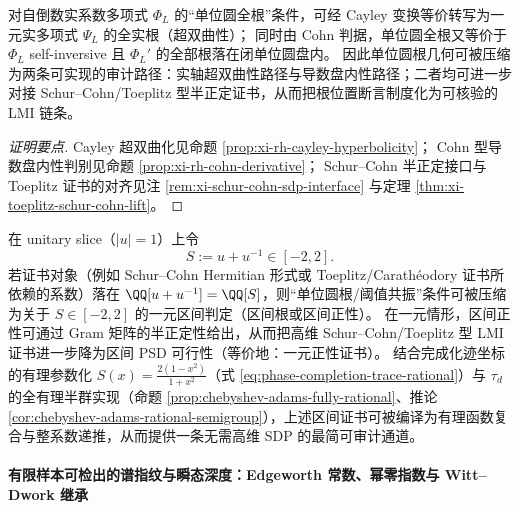 \begin{conclusion}\label{con:xi-cayley-cohn-lmi-certificate-chain}
对自倒数实系数多项式 \(\Phi_L\) 的“单位圆全根”条件，可经 Cayley 变换等价转写为一元实多项式 \(\Psi_L\) 的全实根（超双曲性）；
同时由 Cohn 判据，单位圆全根又等价于 \(\Phi_L\) self-inversive 且 \(\Phi_L'\) 的全部根落在闭单位圆盘内。
因此单位圆根几何可被压缩为两条可实现的审计路径：实轴超双曲性路径与导数盘内性路径；二者均可进一步对接 Schur--Cohn/Toeplitz 型半正定证书，从而把根位置断言制度化为可核验的 LMI 链条。
\end{conclusion}
\begin{proof}[证明要点]
Cayley 超双曲化见命题 \ref{prop:xi-rh-cayley-hyperbolicity}；
Cohn 型导数盘内性判别见命题 \ref{prop:xi-rh-cohn-derivative}；
Schur--Cohn 半正定接口与 Toeplitz 证书的对齐见注 \ref{rem:xi-schur-cohn-sdp-interface} 与定理 \ref{thm:xi-toeplitz-schur-cohn-lift}。
\end{proof}

\begin{conclusion}\label{con:xi-threshold-resonance-interval-psd-compression}
在 unitary slice（\(|u|=1\)）上令
\[
S:=u+u^{-1}\in[-2,2].
\]
若证书对象（例如 Schur--Cohn Hermitian 形式或 Toeplitz/Carath\'eodory 证书所依赖的系数）落在 \(\QQ[u+u^{-1}]=\QQ[S]\)，则“单位圆根/阈值共振”条件可被压缩为关于 \(S\in[-2,2]\) 的一元区间判定（区间根或区间正性）。
在一元情形，区间正性可通过 Gram 矩阵的半正定性给出，从而把高维 Schur--Cohn/Toeplitz 型 LMI 证书进一步降为区间 PSD 可行性（等价地：一元正性证书）。
结合完成化迹坐标的有理参数化 \(S(x)=\frac{2(1-x^2)}{1+x^2}\)（式 \eqref{eq:phase-completion-trace-rational}）与 \(\tau_d\) 的全有理半群实现（命题 \ref{prop:chebyshev-adams-fully-rational}、推论 \ref{cor:chebyshev-adams-rational-semigroup}），上述区间证书可被编译为有理函数复合与整系数递推，从而提供一条无需高维 SDP 的最简可审计通道。
\end{conclusion}







\paragraph{有限样本可检出的谱指纹与瞬态深度：Edgeworth 常数、幂零指数与 Witt--Dwork 继承}

